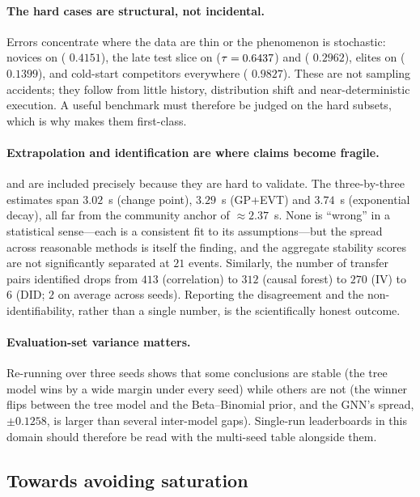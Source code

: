 \paragraph{The hard cases are structural, not incidental.} Errors concentrate
where the data are thin or the phenomenon is stochastic: novices on 
(\maelog{} $0.4151$), the late test slice on  ($\tau=0.6437$) and
 (\aucpr{} $0.2962$), elites on  (\aucpr{} $0.1399$), and
cold-start competitors everywhere (\maelog{} $0.9827$). These are not sampling
accidents; they follow from little history, distribution shift and
near-deterministic execution. A useful benchmark must therefore be judged on
the hard subsets, which is why \wcabench{} makes them first-class.

\paragraph{Extrapolation and identification are where claims become fragile.}
 and  are included precisely because they are hard to validate.
The  three-by-three estimates span $3.02$~s (change point), $3.29$~s
(GP+EVT) and $3.74$~s (exponential decay), all far from the community anchor of
$\approx 2.37$~s. None is ``wrong'' in a statistical sense---each is a
consistent fit to its assumptions---but the spread across reasonable methods is
itself the finding, and the aggregate stability scores are not significantly
separated at $21$ events. Similarly, the number of transfer pairs identified
drops from $413$ (correlation) to $312$ (causal forest) to $270$ (IV) to $6$
(DID; $2$ on average across seeds). Reporting the disagreement and the
non-identifiability, rather than a single number, is the scientifically honest
outcome.

\paragraph{Evaluation-set variance matters.} Re-running over three seeds shows
that some conclusions are stable (the tree model wins  by a wide margin
under every seed) while others are not (the  winner flips between the
tree model and the Beta--Binomial prior, and the GNN's  spread,
$\pm0.1258$, is larger than several inter-model gaps). Single-run leaderboards
in this domain should therefore be read with the multi-seed table alongside
them.

\subsection{Towards avoiding saturation}
\label{sec:disc-saturation}

